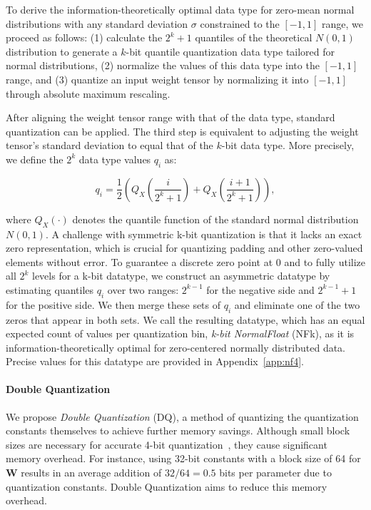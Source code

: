 To derive the information-theoretically optimal data type for zero-mean normal distributions with any standard deviation $\sigma$ constrained to the $[-1, 1]$ range, we proceed as follows: (1) calculate the $2^k+1$ quantiles of the theoretical $N(0, 1)$ distribution to generate a $k$-bit quantile quantization data type tailored for normal distributions, (2) normalize the values of this data type into the $[-1, 1]$ range, and (3) quantize an input weight tensor by normalizing it into $[-1, 1]$ through absolute maximum rescaling.

After aligning the weight tensor range with that of the data type, standard quantization can be applied. The third step is equivalent to adjusting the weight tensor's standard deviation to equal that of the $k$-bit data type. More precisely, we define the $2^k$ data type values $q_i$ as:

\begin{equation}
q_i  = \frac{1}{2}\left( Q_X\left(\frac{i}{2^k+1}\right) + Q_X\left(\frac{i+1}{2^k+1}\right)\right),
\end{equation}

where $Q_X(\cdot)$ denotes the quantile function of the standard normal distribution $N(0,1)$. A challenge with symmetric k-bit quantization is that it lacks an exact zero representation, which is crucial for quantizing padding and other zero-valued elements without error. To guarantee a discrete zero point at $0$ and to fully utilize all $2^k$ levels for a k-bit datatype, we construct an asymmetric datatype by estimating quantiles $q_i$ over two ranges: $2^{k-1}$ for the negative side and $2^{k-1}+1$ for the positive side. We then merge these sets of $q_i$ and eliminate one of the two zeros that appear in both sets. We call the resulting datatype, which has an equal expected count of values per quantization bin, \emph{k-bit NormalFloat} (NFk), as it is information-theoretically optimal for zero-centered normally distributed data. Precise values for this datatype are provided in Appendix~\ref{app:nf4}.

\paragraph{Double Quantization{}} 
We propose \emph{Double Quantization} (DQ), a method of quantizing the quantization constants themselves to achieve further memory savings. Although small block sizes are necessary for accurate 4-bit quantization~\citep{dettmers2022case}, they cause significant memory overhead. For instance, using 32-bit constants with a block size of 64 for $\mathbf{W}$ results in an average addition of $32/64 = 0.5$ bits per parameter due to quantization constants. Double Quantization aims to reduce this memory overhead.

